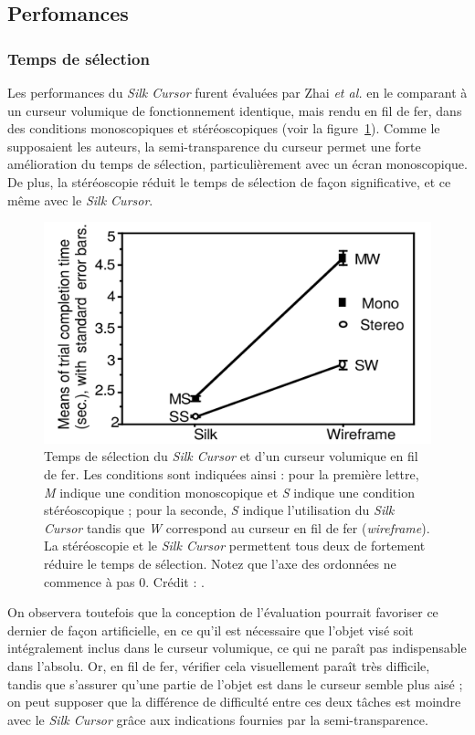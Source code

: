 	\subsection{Perfomances}
	\subsubsection{Temps de sélection}
	Les performances du \emph{Silk Cursor} furent évaluées par Zhai \emph{et al.} en le comparant à un curseur volumique de fonctionnement identique, mais rendu en fil de fer, dans des conditions monoscopiques et stéréoscopiques (voir la figure~\ref{fig:silkPerf}). Comme le supposaient les auteurs, la semi-transparence du curseur permet une forte amélioration du temps de sélection, particulièrement avec un écran monoscopique. De plus, la stéréoscopie réduit le temps de sélection de façon significative, et ce même avec le \emph{Silk Cursor}.
	
	\begin{figure}[H]
		\centering
		\includegraphics[width=\textwidth]{figures/ch2/silkPerf}
		\caption[Temps de sélection du \emph{Silk Cursor}]{Temps de sélection du \emph{Silk Cursor} et d'un curseur volumique en fil de fer. Les conditions sont indiquées ainsi : pour la première lettre, \emph{M} indique une condition monoscopique et \emph{S} indique une condition stéréoscopique ; pour la seconde, \emph{S} indique l'utilisation du \emph{Silk Cursor} tandis que \emph{W} correspond au curseur en fil de fer (\emph{wireframe}). La stéréoscopie et le \emph{Silk Cursor} permettent tous deux de fortement réduire le temps de sélection. Notez que l'axe des ordonnées ne commence à pas $0$. Crédit : \cite{zhai1994silk}.}
		\label{fig:silkPerf}
	\end{figure}
	
	On observera toutefois que la conception de l'évaluation pourrait favoriser ce dernier de façon artificielle, en ce qu'il est nécessaire que l'objet visé soit intégralement inclus dans le curseur volumique, ce qui ne paraît pas indispensable dans l'absolu. Or, en fil de fer, vérifier cela visuellement paraît très difficile, tandis que s'assurer qu'une partie de l'objet est dans le curseur semble plus aisé ; on peut supposer que la différence de difficulté entre ces deux tâches est moindre avec le \emph{Silk Cursor} grâce aux indications fournies par la semi-transparence.
	
